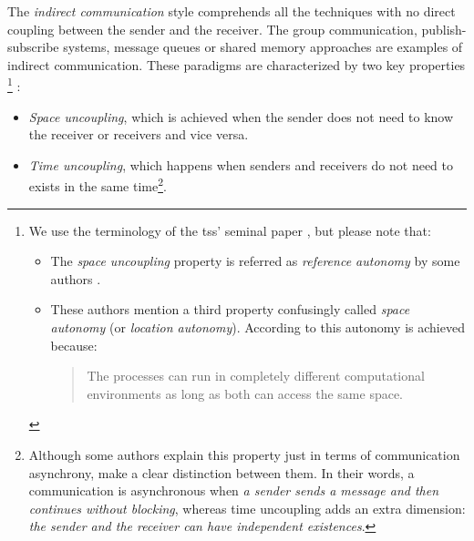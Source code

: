The \emph{indirect communication} style comprehends all the techniques with no direct coupling between the sender and the receiver.
The group communication, publish-subscribe systems, message queues or shared memory approaches are examples of indirect communication.
These paradigms are characterized by two key properties \citep{gelernter_generative_1985,coulouris_distributed_2012}
\footnote{
  We use the terminology of the  \aclp{ts}' seminal paper \citep{gelernter_generative_1985}, but please note that:
  \begin{itemize}
    \item The \emph{space uncoupling} property is referred as \emph{reference autonomy} by some authors \citep{fensel_triple-space_2004}.
    \item These authors mention a third property confusingly called \emph{space autonomy} (or \emph{location autonomy}).
	  According to \citet{fensel_triple-space_2004} this autonomy is achieved because:
	  \begin{quote}
	    The processes can run in completely different computational environments as long as both can access the same space.
	  \end{quote}
  \end{itemize}
}
:

\begin{itemize}
 \item \emph{Space uncoupling}, which is achieved when the sender does not need to know the receiver or receivers and vice versa.
 \item \emph{Time uncoupling}, which happens when senders and receivers do not need to exists in the same time\footnote{
	  Although some authors \citep{fensel_triple-space_2004,krummenacher_www_2005} explain this property just in terms of communication asynchrony,
	  \citet{coulouris_distributed_2012} make a clear distinction between them.
	  In their words, a communication is asynchronous when \emph{a sender sends a message and then continues without blocking},
	  whereas time uncoupling adds an extra dimension: \emph{the sender and the receiver can have independent existences}.
	  }.
 
\end{itemize}

